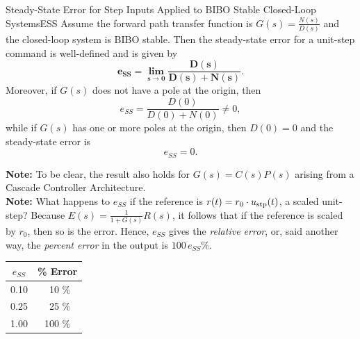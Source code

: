 \begin{propColor}{Steady-State Error for Step Inputs Applied to BIBO Stable Closed-Loop Systems}{ESS} Assume the forward path transfer function is $G(s) = \frac{N(s)}{D(s)}$ and the closed-loop system is BIBO stable. Then the steady-state error for a unit-step command is well-defined and is given by
\begin{equation}
\label{eqn:SSError:SSE:stepb}
\bm{e_{SS} =\lim_{s \to 0} \frac{D(s)} {D(s) + N(s)}}.
\end{equation}
Moreover, if $G(s)$ does not have a pole at the origin, then
$$e_{SS} =\frac{D(0)}{D(0) + N(0)}\not = 0,$$
while if $G(s)$ has one or more poles at the origin, then $D(0)=0$ and the steady-state error is 
$$e_{SS} = 0.$$


\textbf{Note:} To be clear, the result also holds for $G(s) = C(s) P(s)$ arising from a Cascade Controller Architecture. \\
 

\textbf{Note:} What happens to $e_{SS}$ if the reference is $r(t) = r_0 \cdot u_{\rm stp}(t)$, a scaled unit-step? Because $E(s) = \frac{1}{1 + G(s)} R(s)$, it follows that if the reference is scaled by $r_0$, then so is the error. Hence, $e_{SS}$ gives the \textit{relative error}, or, said another way, the \textit{percent error} in the output is $100\, e_{SS} \%$. 

\begin{center}
\renewcommand{\arraystretch}{1.5}
\begin{tabular}{|c|c|}
\hline
$e_{SS}$ & \% Error \\ \hline
0.10 &  ~10 \%  \\ \hline
0.25  &  ~25 \% \\ \hline
1.00   &  100 \%  \\ \hline
\end{tabular}
\end{center}
   
\end{propColor}

\bigskip

